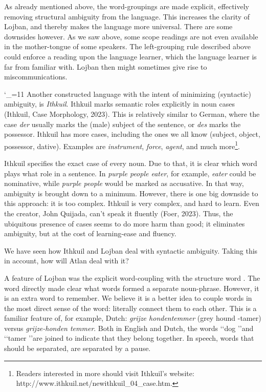 As already mentioned above, the word-groupings are made explicit, effectively removing structural ambiguity from the language. This increases the clarity of Lojban, and thereby makes the language more universal. There are some downsides however. As we saw above, some scope readings are not even available in the mother-tongue of some speakers. The left-grouping rule described above could enforce a reading upon the language learner, which the language learner is far from familiar with. Lojban then might sometimes give rise to miscommunications. 

\catcode`\_=11
Another constructed language with the intent of minimizing (syntactic) ambiguity, is {\it Ithkuil}. Ithkuil marks semantic roles explicitly in noun cases (Ithkuil, Case Morphology, 2023). This is relatively similar to German, where the case {\it der} usually marks the (male) subject of the sentence, or {\it des} marks the possessor. Ithkuil has more cases, including the ones we all know (subject, object, possessor, dative). Examples are {\it instrument}, {\it force}, {\it agent}, and much more\footnote{Readers interested in more should visit Ithkuil's website: http://www.ithkuil.net/newithkuil_04_case.htm.}. 


Ithkuil specifies the exact case of every noun. Due to that, it is clear which word plays what role in a sentence. In {\it purple people eater}, for example, {\it eater} could be nominative, while {\it purple people} would be marked as accusative. In that way, ambiguity is brought down to a minimum. However, there is one big downside to this approach: it is too complex. Ithkuil is very complex, and hard to learn. Even the creator, John Quijada, can't speak it fluently (Foer, 2023). Thus, the ubiquitous presence of cases seems to do more harm than good; it eliminates ambiguity, but at the cost of learning-ease and fluency.

We have seen how Ithkuil and Lojban deal with syntactic ambiguity. Taking this in account, how will Atlan deal with it?

A feature of Lojban was the explicit word-coupling with the structure word \bo. The word directly made clear what words formed a separate noun-phrase. However, it is an extra word to remember. We believe it is a better idea to couple words in the most direct sense of the word: literally connect them to each other. This is a familiar feature of, for example, Dutch: {\it grijze hondentemmer} (grey hound -tamer) versus {\it grijze-honden temmer}. Both in English and Dutch, the words \lq\lq dog \rq\rq and \lq\lq tamer \rq\rq are joined to indicate that they belong together. In speech, words that should be separated, are separated by a pause. 

